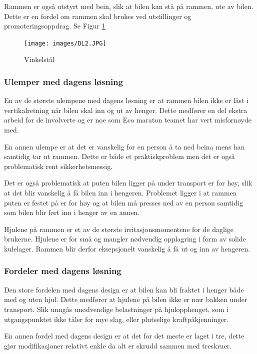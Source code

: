 Rammen er også utstyrt med bein, slik at bilen kan stå på rammen, ute av bilen. Dette er en fordel om rammen skal brukes ved utstillinger og promoteringsoppdrag.  Se Figur \ref{F3} 

\begin{figure}[h!]
\centerline{\texttt{[image: images/DL2.JPG]}}
\caption{Vinkelstål}
\label{F3}
\end{figure}

\subsubsection{Ulemper med dagens løsning}

En av de største ulempene med dagens løsning er at rammen bilen ikke er låst i vertikalretning når bilen skal inn og ut av henger. Dette medfører en del ekstra arbeid for de involverte og er noe som Eco maraton teamet har vert misfornøyde med.

En annen ulempe er at det er vanskelig for en person å ta ned beina mens han samtidig tar ut rammen. Dette er både et praktiskproblem men det er også problematisk rent sikkerhetsmessig. 

Det er også problematisk at puten bilen ligger på under transport er for høy, slik at det blir vanskelig å få bilen inn i hengeren. Problemet ligger i at rammen puten er festet på er for høy og at bilen må presses ned av en person samtidig som bilen blir ført inn i henger av en annen.

Hjulene på rammen er et av de største irritasjonsmomentene for de daglige brukerne. Hjulene er for små og mangler nødvendig opplagring i form av solide kulelager. Rammen blir derfor eksepsjonelt vanskelig å få ut og inn av hengeren. 

\subsubsection{Fordeler med dagens løsning}

Den store fordelen med dagens design er at bilen kan bli fraktet i henger både med og uten hjul. Dette medfører at hjulene på bilen ikke er nær bakken under transport. Slik unngås unødvendige belastninger på hjulopphenget, som i utgangspunktet ikke tåler for mye slag, eller plutselige kraftpåkjenninger. 

En annen fordel med dagens design er at det for det meste er laget i tre, dette gjør modifikasjoner relativt enkle da alt er skrudd sammen med treskruer.


